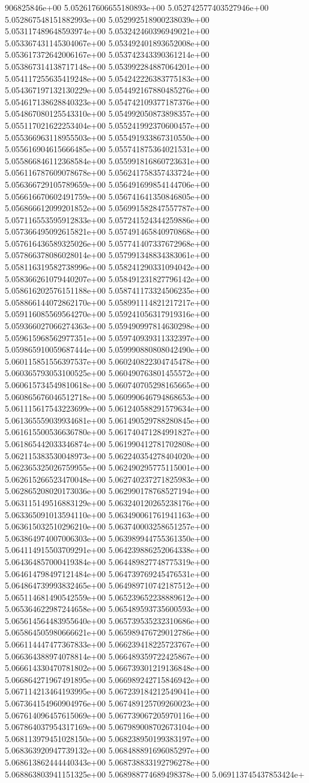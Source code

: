 906825846e+00	5.052617606655180893e+00	5.052742577403527946e+00	5.052867548151882993e+00	5.052992518900238039e+00	5.053117489648593974e+00	5.053242460396949021e+00	5.053367431145304067e+00	5.053492401893652008e+00	5.053617372642006167e+00	5.053742343390361214e+00	5.053867314138717148e+00	5.053992284887064201e+00	5.054117255635419248e+00	5.054242226383775183e+00	5.054367197132130229e+00	5.054492167880485276e+00	5.054617138628840323e+00	5.054742109377187376e+00	5.054867080125543310e+00	5.054992050873898357e+00	5.055117021622253404e+00	5.055241992370600457e+00	5.055366963118955503e+00	5.055491933867310550e+00	5.055616904615666485e+00	5.055741875364021531e+00	5.055866846112368584e+00	5.055991816860723631e+00	5.056116787609078678e+00	5.056241758357433724e+00	5.056366729105789659e+00	5.056491699854144706e+00	5.056616670602491759e+00	5.056741641350846805e+00	5.056866612099201852e+00	5.056991582847557787e+00	5.057116553595912833e+00	5.057241524344259886e+00	5.057366495092615821e+00	5.057491465840970868e+00	5.057616436589325026e+00	5.057741407337672968e+00	5.057866378086028014e+00	5.057991348834383061e+00	5.058116319582738996e+00	5.058241290331094042e+00	5.058366261079440207e+00	5.058491231827796142e+00	5.058616202576151188e+00	5.058741173324506235e+00	5.058866144072862170e+00	5.058991114821217217e+00	5.059116085569564270e+00	5.059241056317919316e+00	5.059366027066274363e+00	5.059490997814630298e+00	5.059615968562977351e+00	5.059740939311332397e+00	5.059865910059687444e+00	5.059990880808042490e+00	5.060115851556397537e+00	5.060240822304745478e+00	5.060365793053100525e+00	5.060490763801455572e+00	5.060615734549810618e+00	5.060740705298165665e+00	5.060865676046512718e+00	5.060990646794868653e+00	5.061115617543223699e+00	5.061240588291579634e+00	5.061365559039934681e+00	5.061490529788280845e+00	5.061615500536636780e+00	5.061740471284991827e+00	5.061865442033346874e+00	5.061990412781702808e+00	5.062115383530048973e+00	5.062240354278404020e+00	5.062365325026759955e+00	5.062490295775115001e+00	5.062615266523470048e+00	5.062740237271825983e+00	5.062865208020173036e+00	5.062990178768527194e+00	5.063115149516883129e+00	5.063240120265238176e+00	5.063365091013594110e+00	5.063490061761941163e+00	5.063615032510296210e+00	5.063740003258651257e+00	5.063864974007006303e+00	5.063989944755361350e+00	5.064114915503709291e+00	5.064239886252064338e+00	5.064364857000419384e+00	5.064489827748775319e+00	5.064614798497121484e+00	5.064739769245476531e+00	5.064864739993832465e+00	5.064989710742187512e+00	5.065114681490542559e+00	5.065239652238889612e+00	5.065364622987244658e+00	5.065489593735600593e+00	5.065614564483955640e+00	5.065739535232310686e+00	5.065864505980666621e+00	5.065989476729012786e+00	5.066114447477367833e+00	5.066239418225723767e+00	5.066364388974078814e+00	5.066489359722425867e+00	5.066614330470781802e+00	5.066739301219136848e+00	5.066864271967491895e+00	5.066989242715846942e+00	5.067114213464193995e+00	5.067239184212549041e+00	5.067364154960904976e+00	5.067489125709260023e+00	5.067614096457615069e+00	5.067739067205970116e+00	5.067864037954317169e+00	5.067989008702673104e+00	5.068113979451028150e+00	5.068238950199383197e+00	5.068363920947739132e+00	5.068488891696085297e+00	5.068613862444440343e+00	5.068738833192796278e+00	5.068863803941151325e+00	5.068988774689498378e+00	5.069113745437853424e+